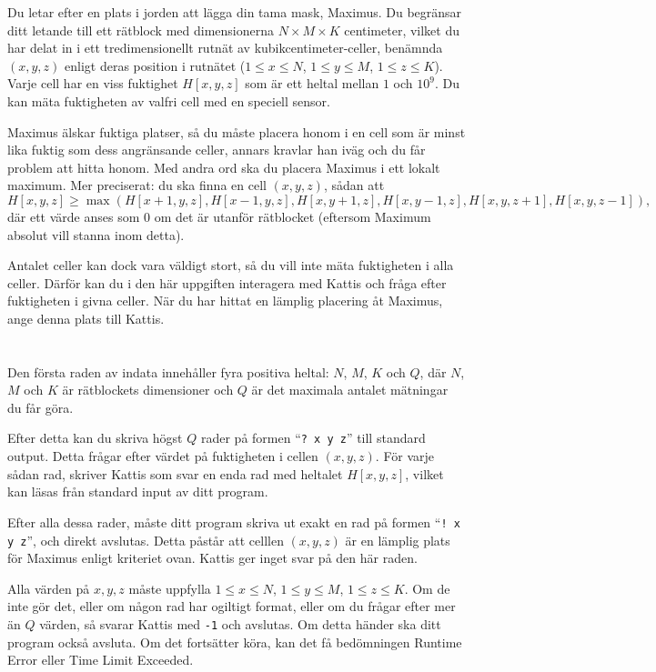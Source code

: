 \ifx\boi\undefined\fi
\def\version{jury-1}

Du letar efter en plats i jorden att lägga din tama mask, Maximus. Du begränsar ditt letande till ett rätblock med dimensionerna $N \times M \times K$ centimeter, vilket du har delat in i ett tredimensionellt rutnät av kubikcentimeter-celler, benämnda $(x,y,z)$ enligt deras position i rutnätet ($1 \le x \le N$, $1 \le y \le M$, $1 \le z \le K$). Varje cell har en viss fuktighet $H[x,y,z]$ som är ett heltal mellan $1$ och $10^9$. Du kan mäta fuktigheten av valfri cell med en speciell sensor.

Maximus älskar fuktiga platser, så du måste placera honom i en cell som är minst lika fuktig som dess angränsande celler, annars kravlar han iväg och du får problem att hitta honom. Med andra ord ska du placera Maximus i ett lokalt maximum.
Mer preciserat: du ska finna en cell $(x,y,z)$, sådan att
$$
H[x,y,z] \ge \max(H[x+1,y,z], H[x-1,y,z], H[x,y+1,z], H[x,y-1,z], H[x,y,z+1], H[x,y,z-1]),
$$
där ett värde anses som $0$ om det är utanför rätblocket (eftersom Maximum absolut vill stanna inom detta).

Antalet celler kan dock vara väldigt stort, så du vill inte mäta fuktigheten i alla celler. Därför kan du i den här uppgiften interagera med Kattis och fråga efter fuktigheten i givna celler. När du har hittat en lämplig placering åt Maximus, ange denna plats till Kattis.

\section*{\interactivity}
Den första raden av indata innehåller fyra positiva heltal: $N$, $M$, $K$ och $Q$, där $N$, $M$ och $K$ är rätblockets dimensioner och $Q$ är det maximala antalet mätningar du får göra.

Efter detta kan du skriva högst $Q$ rader på formen ``\texttt{?\ x y z}'' till standard output.
Detta frågar efter värdet på fuktigheten i cellen  $(x, y, z)$.
För varje sådan rad, skriver Kattis som svar en enda rad med heltalet $H[x,y,z]$, vilket kan läsas från standard input av ditt program.

Efter alla dessa rader, måste ditt program skriva ut exakt en rad på formen ``\texttt{!\ x y z}'', och direkt avslutas.
Detta påstår att celllen $(x, y, z)$ är en lämplig plats för Maximus enligt kriteriet ovan. Kattis ger inget svar på den här raden.

Alla värden på $x, y, z$ måste uppfylla $1 \le x \le N$, $1 \le y \le M$, $1 \le z \le K$.
Om de inte gör det, eller om någon rad har ogiltigt format, eller om du frågar efter mer än $Q$ värden,
så svarar Kattis med \texttt{-1} och avslutas. 
Om detta händer ska ditt program också avsluta. Om det fortsätter köra, kan det få bedömningen Runtime Error eller Time Limit Exceeded.

